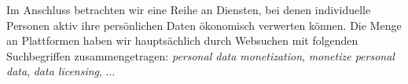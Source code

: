Im Anschluss betrachten wir eine Reihe an Diensten, bei denen individuelle Personen aktiv ihre persönlichen Daten ökonomisch verwerten können. Die Menge an Plattformen haben wir hauptsächlich durch Websuchen mit folgenden Suchbegriffen zusammengetragen: \textit{personal data monetization}, \textit{monetize personal data}, \textit{data licensing}, ...